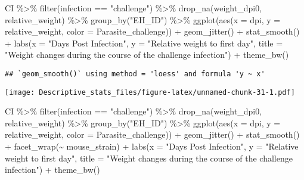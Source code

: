 \documentclass[
]{article}
\newenvironment{Shaded}{\begin{snugshade}}{\end{snugshade}}
\newcommand{\AttributeTok}[1]{\textcolor[rgb]{0.77,0.63,0.00}{#1}}
\newcommand{\FunctionTok}[1]{\textcolor[rgb]{0.00,0.00,0.00}{#1}}
\newcommand{\NormalTok}[1]{#1}
\newcommand{\SpecialCharTok}[1]{\textcolor[rgb]{0.00,0.00,0.00}{#1}}
\newcommand{\StringTok}[1]{\textcolor[rgb]{0.31,0.60,0.02}{#1}}
\begin{document}
\begin{Shaded}
\begin{Highlighting}[]
\NormalTok{CI }\SpecialCharTok{\%\textgreater{}\%} 
    \FunctionTok{filter}\NormalTok{(infection }\SpecialCharTok{==} \StringTok{"challenge"}\NormalTok{) }\SpecialCharTok{\%\textgreater{}\%}
    \FunctionTok{drop\_na}\NormalTok{(weight\_dpi0, relative\_weight) }\SpecialCharTok{\%\textgreater{}\%}
    \FunctionTok{group\_by}\NormalTok{(}\StringTok{"EH\_ID"}\NormalTok{) }\SpecialCharTok{\%\textgreater{}\%}
    \FunctionTok{ggplot}\NormalTok{(}\FunctionTok{aes}\NormalTok{(}\AttributeTok{x =}\NormalTok{ dpi, }\AttributeTok{y =}\NormalTok{ relative\_weight, }\AttributeTok{color =}\NormalTok{ Parasite\_challenge)) }\SpecialCharTok{+}
    \FunctionTok{geom\_jitter}\NormalTok{() }\SpecialCharTok{+}
    \FunctionTok{stat\_smooth}\NormalTok{() }\SpecialCharTok{+}
    \FunctionTok{labs}\NormalTok{(}\AttributeTok{x =} \StringTok{"Days Post Infection"}\NormalTok{, }\AttributeTok{y =} \StringTok{"Relative weight to first day"}\NormalTok{,}
         \AttributeTok{title =} \StringTok{"Weight changes during the course of the challenge infection"}\NormalTok{) }\SpecialCharTok{+}
    \FunctionTok{theme\_bw}\NormalTok{()}
\end{Highlighting}
\end{Shaded}

\begin{verbatim}
## `geom_smooth()` using method = 'loess' and formula 'y ~ x'
\end{verbatim}

\texttt{[image: Descriptive\_stats\_files/figure-latex/unnamed-chunk-31-1.pdf]}

\begin{Shaded}
\begin{Highlighting}[]
\NormalTok{CI }\SpecialCharTok{\%\textgreater{}\%} 
    \FunctionTok{filter}\NormalTok{(infection }\SpecialCharTok{==} \StringTok{"challenge"}\NormalTok{) }\SpecialCharTok{\%\textgreater{}\%}
    \FunctionTok{drop\_na}\NormalTok{(weight\_dpi0, relative\_weight) }\SpecialCharTok{\%\textgreater{}\%}
    \FunctionTok{group\_by}\NormalTok{(}\StringTok{"EH\_ID"}\NormalTok{) }\SpecialCharTok{\%\textgreater{}\%}
    \FunctionTok{ggplot}\NormalTok{(}\FunctionTok{aes}\NormalTok{(}\AttributeTok{x =}\NormalTok{ dpi, }\AttributeTok{y =}\NormalTok{ relative\_weight, }\AttributeTok{color =}\NormalTok{ Parasite\_challenge)) }\SpecialCharTok{+}
    \FunctionTok{geom\_jitter}\NormalTok{() }\SpecialCharTok{+}
    \FunctionTok{stat\_smooth}\NormalTok{() }\SpecialCharTok{+}
    \FunctionTok{facet\_wrap}\NormalTok{(}\SpecialCharTok{\textasciitilde{}}\NormalTok{ mouse\_strain) }\SpecialCharTok{+}
    \FunctionTok{labs}\NormalTok{(}\AttributeTok{x =} \StringTok{"Days Post Infection"}\NormalTok{, }\AttributeTok{y =} \StringTok{"Relative weight to first day"}\NormalTok{,}
         \AttributeTok{title =} \StringTok{"Weight changes during the course of the challenge infection"}\NormalTok{) }\SpecialCharTok{+}
    \FunctionTok{theme\_bw}\NormalTok{()}
\end{Highlighting}
\end{Shaded}
\end{document}
